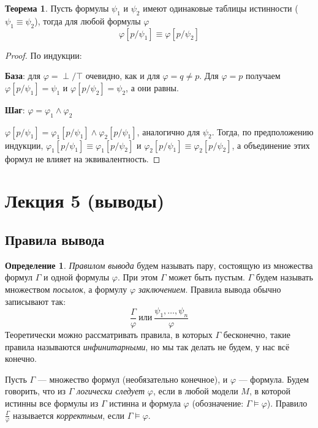 \documentclass[12pt]{article}
\let\eq\equiv
\let\la\land
\theoremstyle{definition}
\newtheorem{definition}{Определение}[section]
\newtheorem{theorem}{Теорема}[section]
\theoremstyle{statement}
\theoremstyle{theorem}
\begin{document}
\begin{theorem}
  Пусть формулы $\psi_1$ и $\psi_2$ имеют одинаковые таблицы
  истинности ($\psi_1 \eq \psi_2$), тогда для любой формулы $\varphi$
  \begin{displaymath}
    \varphi[p/\psi_1] \eq \varphi[p/\psi_2]
  \end{displaymath}
  \begin{proof}
    По индукции:

    \textbf{База}: для $\varphi = \perp / \top$ очевидно, как и для
    $\varphi = q \neq p$. Для $\varphi = p$ получаем $\varphi[p /
    \psi_1] = \psi_1$ и $\varphi[p / \psi_2] = \psi_2$, а они равны.

    \textbf{Шаг}: $\varphi = \varphi_1 \la \varphi_2$

    $\varphi[p / \psi_1] = \varphi_1[p / \psi_1] \la \varphi_2[p /
    \psi_1]$, аналогично для $\psi_2$. Тогда, по предположению
    индукции, $\varphi_1[p / \psi_1] \eq \varphi_1[p / \psi_2]$ и
    $\varphi_2[p / \psi_1] \eq \varphi_2[p / \psi_2]$, а объединение
    этих формул не влияет на эквивалентность.
  \end{proof}
\end{theorem}

\pagebreak

\section{Лекция 5 (выводы)}

\subsection{Правила вывода}

\begin{definition}
  \textit{Правилом вывода} будем называть пару, состоящую из
  множества формул $\Gamma$ и одной формулы $\varphi$. При этом
  $\Gamma$ может быть пустым. $\Gamma$ будем называть множеством
  \textit{посылок}, а формулу $\varphi$ \textit{заключением}. Правила
  вывода обычно записывают так:
  \begin{displaymath}
    \frac{\Gamma}{\varphi}\ \text{или}\ \frac{\psi_1, \dots, \psi_n}{\varphi}
  \end{displaymath}
  Теоретически можно рассматривать правила, в которых $\Gamma$
  бесконечно, такие правила называются \textit{инфинитарными}, но мы
  так делать не будем, у нас всё конечно.

  Пусть $\Gamma$ --- множество формул (необязательно конечное), и
  $\varphi$ --- формула. Будем говорить, что из $\Gamma$
  \textit{логически следует} $\varphi$, если в любой модели $M$, в
  которой истинны все формулы из $\Gamma$ истинна и формула $\varphi$
  (обозначение: $\Gamma \models \varphi$). Правило
  $\frac{\Gamma}{\varphi}$ называется \textit{корректным}, если
  $\Gamma \models \varphi$.
\end{definition}
\end{document}
